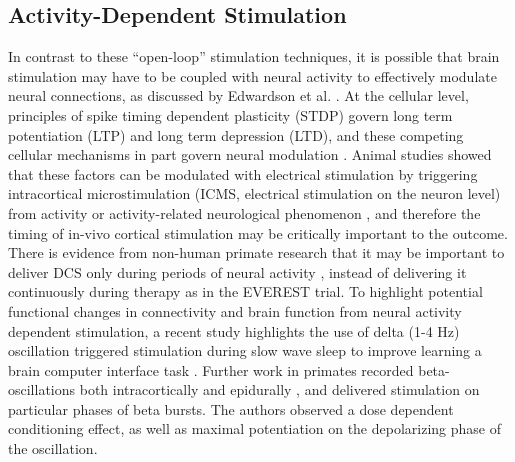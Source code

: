 \subsection{Activity-Dependent Stimulation}
In contrast to these “open-loop” stimulation techniques, it is possible that brain stimulation may have to be coupled with neural activity to effectively modulate neural connections, as discussed by Edwardson et al. \cite{Edwardson2013}. At the cellular level, principles of spike timing dependent plasticity (STDP) govern long term potentiation (LTP) and long term depression (LTD), and these competing cellular mechanisms in part govern neural modulation \cite{Bi1998,Dan2004,Feldman2012,Ganguly2013}. Animal studies showed that these factors can be modulated with electrical stimulation by triggering intracortical microstimulation (ICMS, electrical stimulation on the neuron level) from activity or activity-related neurological phenomenon \cite{Jackson2006}, and therefore the timing of in-vivo cortical stimulation may be critically important to the outcome. There is evidence from non-human primate research that it may be important to deliver DCS only during periods of neural activity \cite{Jackson2006,Lucas2013,Rembado2017,Zanos2018}, instead of delivering it continuously during therapy as in the EVEREST trial. To highlight potential functional changes in connectivity and brain function from neural activity dependent stimulation, a recent study highlights the use of delta (1-4 Hz) oscillation triggered stimulation during slow wave sleep to improve learning a brain computer interface task \cite{Rembado2017}. Further work in primates recorded beta-oscillations both intracortically and epidurally \cite{Zanos2018}, and delivered stimulation on particular phases of beta bursts. The authors observed a dose dependent conditioning effect, as well as maximal potentiation on the depolarizing phase of the oscillation. 

